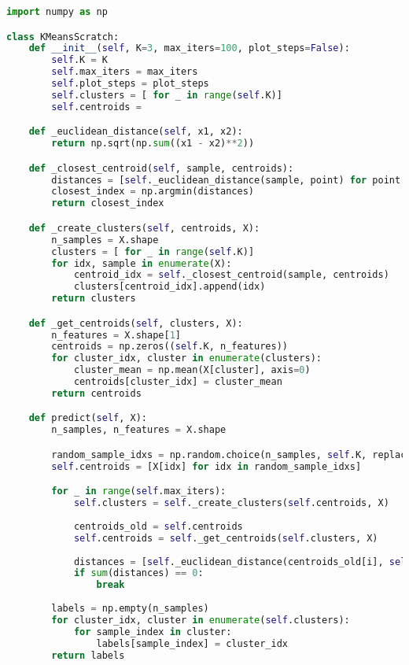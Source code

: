 \documentclass[11pt,a4paper]{article}
\begin{document}
\begin{lstlisting}[language=Python]
import numpy as np

class KMeansScratch:
    def __init__(self, K=3, max_iters=100, plot_steps=False):
        self.K = K
        self.max_iters = max_iters
        self.plot_steps = plot_steps
        self.clusters = [ for _ in range(self.K)]
        self.centroids =

    def _euclidean_distance(self, x1, x2):
        return np.sqrt(np.sum((x1 - x2)**2))

    def _closest_centroid(self, sample, centroids):
        distances = [self._euclidean_distance(sample, point) for point in centroids]
        closest_index = np.argmin(distances)
        return closest_index

    def _create_clusters(self, centroids, X):
        n_samples = X.shape
        clusters = [ for _ in range(self.K)]
        for idx, sample in enumerate(X):
            centroid_idx = self._closest_centroid(sample, centroids)
            clusters[centroid_idx].append(idx)
        return clusters

    def _get_centroids(self, clusters, X):
        n_features = X.shape[1]
        centroids = np.zeros((self.K, n_features))
        for cluster_idx, cluster in enumerate(clusters):
            cluster_mean = np.mean(X[cluster], axis=0)
            centroids[cluster_idx] = cluster_mean
        return centroids

    def predict(self, X):
        n_samples, n_features = X.shape

        random_sample_idxs = np.random.choice(n_samples, self.K, replace=False)
        self.centroids = [X[idx] for idx in random_sample_idxs]

        for _ in range(self.max_iters):
            self.clusters = self._create_clusters(self.centroids, X)
            
            centroids_old = self.centroids
            self.centroids = self._get_centroids(self.clusters, X)
            
            distances = [self._euclidean_distance(centroids_old[i], self.centroids[i]) for i in range(self.K)]
            if sum(distances) == 0:
                break
        
        labels = np.empty(n_samples)
        for cluster_idx, cluster in enumerate(self.clusters):
            for sample_index in cluster:
                labels[sample_index] = cluster_idx
        return labels
\end{lstlisting}
\end{document}
